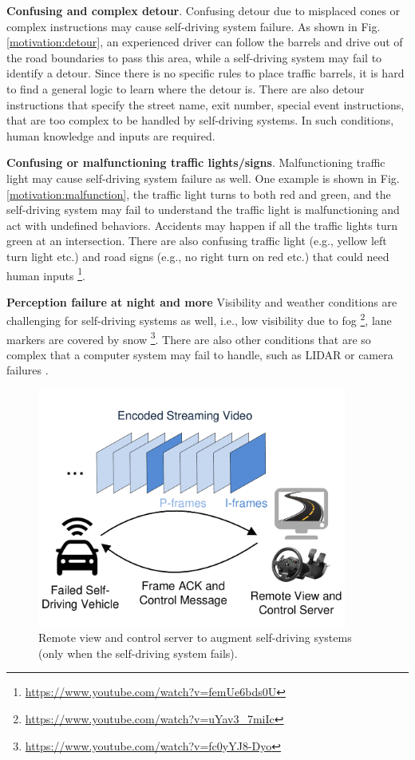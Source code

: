 \textbf{Confusing and complex detour}.
Confusing detour due to misplaced cones or complex instructions 
may cause self-driving system failure. 
As shown in Fig. \ref{motivation:detour}, an experienced driver
can follow the barrels and drive out of the road boundaries
to pass this area, while a self-driving system may 
fail to identify a detour. 
Since there is no specific rules to place
traffic barrels, it is hard to find a general logic to 
learn where the detour is. 
There are also detour instructions that specify the street
name, exit number, special event instructions, 
that are too complex to be handled
by self-driving systems.
In such conditions, human knowledge and inputs are required. 

\textbf{Confusing or malfunctioning traffic lights/signs}.
Malfunctioning traffic light may cause self-driving
system failure as well. 
One example is shown in Fig. \ref{motivation:malfunction}, 
the traffic light turns to both red and green, 
and the self-driving system may fail to understand 
the traffic light is malfunctioning and act
with undefined behaviors.
Accidents may happen if all the traffic lights turn green at
an intersection.  
There are also confusing traffic light (e.g., yellow left turn light etc.)
and road signs (e.g., no right turn on red etc.) that
could need human inputs
\footnote{\url{https://www.youtube.com/watch?v=femUe6bds0U}}. 



\textbf{Perception failure at night and more}
Visibility and weather conditions are challenging for self-driving 
systems as well, 
i.e., low visibility due to fog \footnote{\url{https://www.youtube.com/watch?v=uYav3_7miIc}},
lane markers are covered by snow
\footnote{\url{https://www.youtube.com/watch?v=fc0yYJ8-Dyo}}.
There are also other conditions that are so complex
that a computer system may fail to handle, such as 
LIDAR or camera failures \cite{waymo}.


\begin{figure}[ht]
\centering
\vspace{-0.2cm}
\includegraphics[width=4.0in,angle=0]{Figs/RTDrive/illustration.pdf}
\vspace{-0.4cm}
\caption{Remote view and control server to augment self-driving systems
(only when the self-driving system fails).}
\vspace{-0.4cm}
\label{illustration}
\centering
\end{figure}

